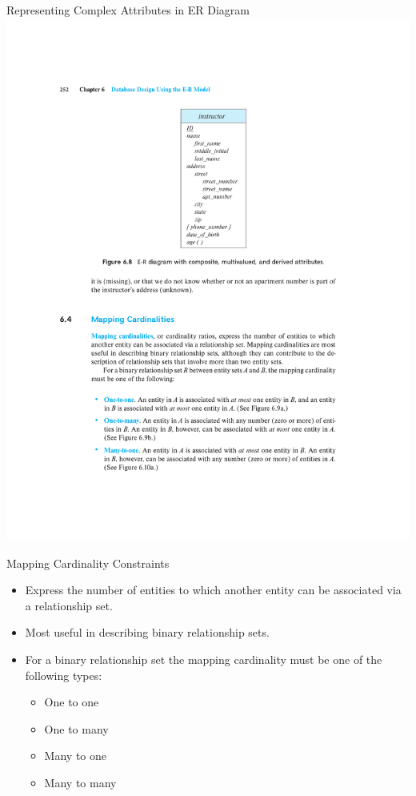\documentclass{beamer}
\begin{document}
\begin{frame}{Representing Complex Attributes in ER Diagram}
    \centering
    \includegraphics[trim={5cm 15.25cm 5cm 4cm}, clip, width=\textwidth]{figures/p252}
\end{frame}

\begin{frame}{Mapping Cardinality Constraints}
    \begin{itemize}
        \item Express the number of entities to which another entity can be associated via a relationship set.
        \item Most useful in describing binary relationship sets.
        \item For a binary relationship set the mapping cardinality must be one of the following types:
        \begin{itemize}
            \item One to one
            \item One to many
            \item Many to one
            \item Many to many
        \end{itemize}
    \end{itemize}
\end{frame}
\end{document}
